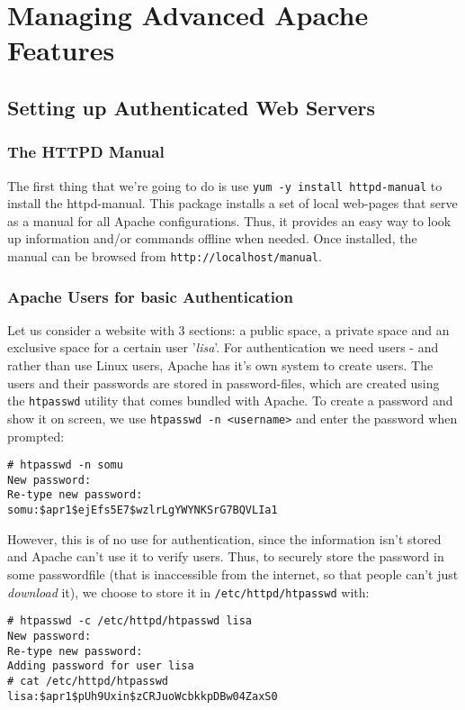 \chapter{Managing Advanced Apache Features}

\section{Setting up Authenticated Web Servers}
\subsection{The HTTPD Manual}
The first thing that we're going to do is use \verb|yum -y install httpd-manual| to install the httpd-manual. This package installs a set of local web-pages that serve as a manual for all Apache configurations. Thus, it provides an easy way to look up information and/or commands offline when needed. Once installed, the manual can be browsed from \verb|http://localhost/manual|.

\subsection{Apache Users for basic Authentication}
Let us consider a website with 3 sections: a public space, a private space and an exclusive space for a certain user '\textit{lisa}'. For authentication we need users - and rather than use Linux users, Apache has it's own system to create users. The users and their passwords are stored in password-files, which are created using the \verb|htpasswd| utility that comes bundled with Apache. To create a password and show it on screen, we use \verb|htpasswd -n <username>| and enter the password when prompted:

\vspace{-15pt}
\begin{verbatim}
# htpasswd -n somu
New password: 
Re-type new password: 
somu:$apr1$ejEfs5E7$wzlrLgYWYNKSrG7BQVLIa1
\end{verbatim}
\vspace{-10pt}	

\noindent
However, this is of no use for authentication, since the information isn't stored and Apache can't use it to verify users. Thus, to securely store the password in some passwordfile (that is inaccessible from the internet, so that people can't just \textit{download} it), we choose to store it in \verb|/etc/httpd/htpasswd| with:

\vspace{-15pt}
\begin{verbatim}
# htpasswd -c /etc/httpd/htpasswd lisa
New password: 
Re-type new password: 
Adding password for user lisa
# cat /etc/httpd/htpasswd
lisa:$apr1$pUh9Uxin$zCRJuoWcbkkpDBw04ZaxS0
\end{verbatim}
\vspace{-10pt}	

